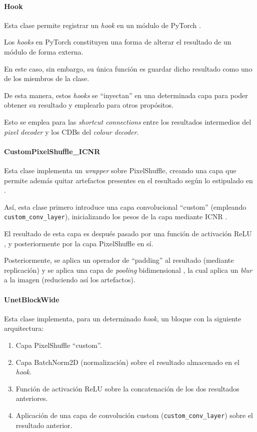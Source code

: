 \documentclass[a4paper]{article}
\begin{document}
\paragraph{Hook}

Esta clase permite registrar un \textit{hook} en un módulo de PyTorch \cite{TorchHook}.

Los \textit{hooks} en PyTorch constituyen una forma de alterar el resultado de un módulo de forma externa.

En este caso, sin embargo, su única función es guardar dicho resultado como uno de los miembros de la clase.

De esta manera, estos \textit{hooks} se ``inyectan'' en una determinada capa para poder obtener su resultado y emplearlo para otros propósitos.

Esto se emplea para las \textit{shortcut connections} entre los resultados intermedios del \textit{pixel decoder} y los CDBs del \textit{colour decoder}.

\paragraph{CustomPixelShuffle\_ICNR}

Esta clase implementa un \textit{wrapper} sobre PixelShuffle, creando una capa que permite además quitar artefactos presentes en el resultado según lo estipulado en \cite{CheckerboardArtifacts}.

Así, esta clase primero introduce una capa convolucional ``custom'' (empleando \texttt{custom\_conv\_layer}), inicializando los pesos de la capa mediante ICNR \cite{ICNR}.

El resultado de esta capa es después pasado por una función de activación ReLU \cite{ReLU}, y posteriormente por la capa PixelShuffle \cite{PixelShuffle} en sí.

Posteriormente, se aplica un operador de ``padding'' al resultado (mediante replicación) y se aplica una capa de \textit{pooling} bidimensional \cite{TorchAvgPool2D}, la cual aplica un \textit{blur} a la imagen (reduciendo así los artefactos).

\paragraph{UnetBlockWide}

Esta clase implementa, para un determinado \textit{hook}, un bloque con la siguiente arquitectura:

\begin{enumerate}
  \item{Capa PixelShuffle ``custom''.}
  \item{Capa BatchNorm2D \cite{BatchNorm,TorchBatchNorm2D} (normalización) sobre el resultado almacenado en el \textit{hook}.}
  \item{Función de activación ReLU sobre la concatenación de los dos resultados anteriores.}
  \item{Aplicación de una capa de convolución custom (\texttt{custom\_conv\_layer}) sobre el resultado anterior.}
\end{enumerate}
\end{document}

